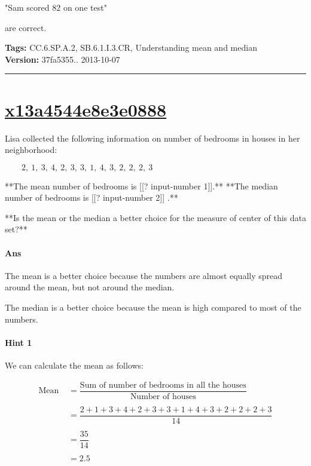 \documentclass[twocolumn,10pt]{article}
\begin{document}
 "Sam scored $82$ on one test"

are correct.



\medskip
\noindent
\textbf{Tags:} {\footnotesize CC.6.SP.A.2, SB.6.1.I.3.CR, Understanding mean and median}\\
\textbf{Version:} 37fa5355.. 2013-10-07
\smallskip\hrule





\section{\href{https://www.khanacademy.org/devadmin/content/items/x13a4544e8e3e0888}{x13a4544e8e3e0888}}

\noindent
Lisa collected the following information on number of bedrooms in houses in her neighborhood: 

$\qquad 2,~1,~3,~4,~2,~3,~3,~1,~4,~3,~2,~2,~2,~3$


**The mean number of bedrooms is [[? input-number 1]].**  
**The median number of bedrooms is [[? input-number 2]] .**

**Is the mean or the median a better choice for the measure of center of this data set?**

\paragraph{Ans} 

The mean is a better choice because the numbers are almost equally spread around the mean, but not around the median.

The median is a better choice because the mean is  high compared to most of the numbers.


 

\paragraph{Hint 1}We can calculate the mean as follows:

\begin{align*}\text{Mean }&=\dfrac{\text{Sum of number of bedrooms in all the houses}}{\text{Number of houses}}\\
\\
&=\dfrac{2+1+3+4+2+3+3+1+4+3+2+2+2+3}{14}\\
\\
&= \dfrac{35}{14}\\
\\
&=2.5\end{align*}
\end{document}
